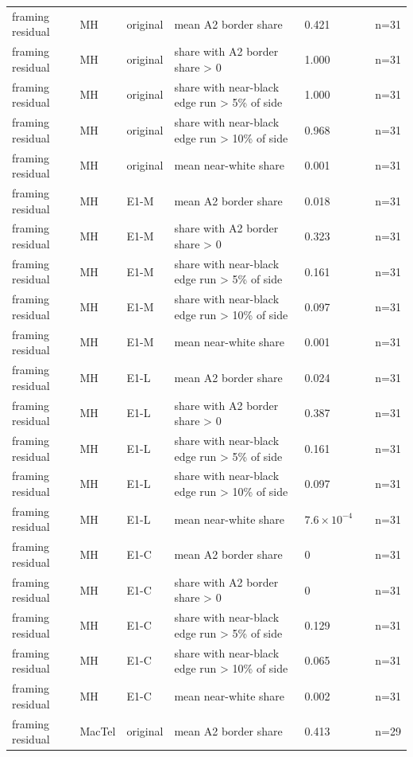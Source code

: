 \begin{longtable}{@{}p{3.3cm}lp{1.5cm}p{3.6cm}p{2.2cm}p{1.6cm}p{3.2cm}@{}}
framing residual & MH & original & mean A2 border share & 0.421 &  & n=31 \\
framing residual & MH & original & share with A2 border share > 0 & 1.000 &  & n=31 \\
framing residual & MH & original & share with near-black edge run > 5\% of side & 1.000 &  & n=31 \\
framing residual & MH & original & share with near-black edge run > 10\% of side & 0.968 &  & n=31 \\
framing residual & MH & original & mean near-white share & 0.001 &  & n=31 \\
framing residual & MH & E1-M & mean A2 border share & 0.018 &  & n=31 \\
framing residual & MH & E1-M & share with A2 border share > 0 & 0.323 &  & n=31 \\
framing residual & MH & E1-M & share with near-black edge run > 5\% of side & 0.161 &  & n=31 \\
framing residual & MH & E1-M & share with near-black edge run > 10\% of side & 0.097 &  & n=31 \\
framing residual & MH & E1-M & mean near-white share & 0.001 &  & n=31 \\
framing residual & MH & E1-L & mean A2 border share & 0.024 &  & n=31 \\
framing residual & MH & E1-L & share with A2 border share > 0 & 0.387 &  & n=31 \\
framing residual & MH & E1-L & share with near-black edge run > 5\% of side & 0.161 &  & n=31 \\
framing residual & MH & E1-L & share with near-black edge run > 10\% of side & 0.097 &  & n=31 \\
framing residual & MH & E1-L & mean near-white share & $7.6\times10^{-4}$ &  & n=31 \\
framing residual & MH & E1-C & mean A2 border share & 0 &  & n=31 \\
framing residual & MH & E1-C & share with A2 border share > 0 & 0 &  & n=31 \\
framing residual & MH & E1-C & share with near-black edge run > 5\% of side & 0.129 &  & n=31 \\
framing residual & MH & E1-C & share with near-black edge run > 10\% of side & 0.065 &  & n=31 \\
framing residual & MH & E1-C & mean near-white share & 0.002 &  & n=31 \\
framing residual & MacTel & original & mean A2 border share & 0.413 &  & n=29 \\

\end{longtable}
